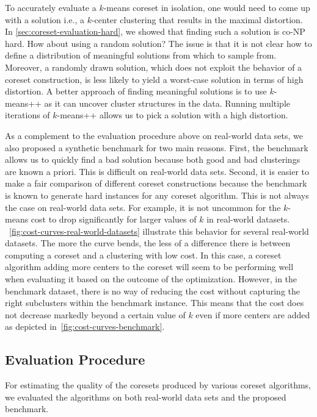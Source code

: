 To accurately evaluate a $k$-means coreset in isolation, one would need to come up with a solution i.e., a $k$-center clustering that results in the maximal distortion. In \cref{sec:coreset-evaluation-hard}, we showed that finding such a solution is co-NP hard. How about using a random solution? The issue is that it is not clear how to define a distribution of meaningful solutions from which to sample from. Moreover, a randomly drawn solution, which does not exploit the behavior of a coreset construction, is less likely to yield a worst-case solution in terms of high distortion. A better approach of finding meaningful solutions is to use $k$-means++ as it can uncover cluster structures in the data. Running multiple iterations of $k$-means++ allows us to pick a solution with a high distortion.





As a complement to the evaluation procedure above on real-world data sets, we also proposed a synthetic benchmark for two main reasons. 
% 
First, the benchmark allows us to quickly find a bad solution because both good and bad clusterings are known a priori. This is difficult on real-world data sets.
% 
Second, it is easier to make a fair comparison of different coreset constructions because the benchmark is known to generate hard instances for any coreset algorithm. This is not always the case on real-world data sets.
For example, it is not uncommon for the $k$-means cost to drop significantly for larger values of $k$ in real-world datasets.
~\cref{fig:cost-curves-real-world-datasets} illustrate this behavior for several real-world datasets. The more the curve bends, the less of a difference there is between computing a coreset and a clustering with low cost. In this case, a coreset algorithm adding more centers to the coreset will seem to be performing well when evaluating it based on the outcome of the optimization. However, in the benchmark dataset, there is no way of reducing the cost without capturing the right subclusters within the benchmark instance. This means that the cost does not decrease markedly beyond a certain value of $k$ even if more centers are added as depicted in~\cref{fig:cost-curves-benchmark}.




\subsection{Evaluation Procedure}
For estimating the quality of the coresets produced by various coreset algorithms, we evaluated the algorithms on both real-world data sets and the proposed benchmark. 

